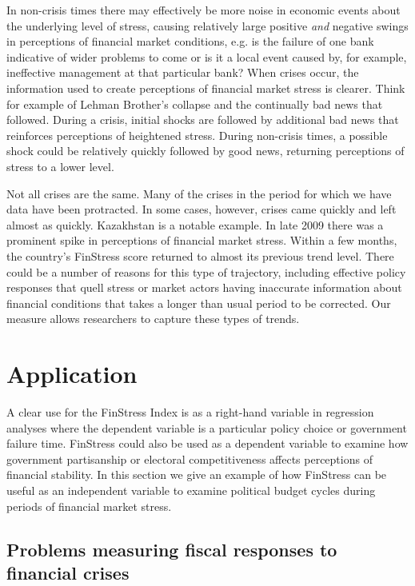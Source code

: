 \documentclass[]{article}
\begin{document}
In non-crisis times there may effectively be more noise in economic events about the underlying level of stress, causing relatively large positive \emph{and} negative swings in perceptions of financial market conditions, e.g. is the failure of one bank indicative of wider problems to come or is it a local event caused by, for example, ineffective management at that particular bank? When crises occur, the information used to create perceptions of financial market stress is clearer. Think for example of Lehman Brother's collapse and the continually bad news that followed. During a crisis, initial shocks are followed by additional bad news that reinforces perceptions of heightened stress. During non-crisis times, a possible shock could be relatively quickly followed by good news, returning perceptions of stress to a lower level.

Not all crises are the same. Many of the crises in the period for which we have data have been protracted. In some cases, however, crises came quickly and left almost as quickly. Kazakhstan is a notable example. In late 2009 there was a prominent spike in perceptions of financial market stress. Within a few months, the country's FinStress score returned to almost its previous trend level. There could be a number of reasons for this type of trajectory, including effective policy responses that quell stress or market actors having inaccurate information about financial conditions that takes a longer than usual period to be corrected. Our measure allows researchers to capture these types of trends.

\section{Application}\label{application}

A clear use for the FinStress Index is as a right-hand variable in regression analyses where the dependent variable is a particular policy choice or government failure time. FinStress could also be used as a dependent variable to examine how government partisanship or electoral competitiveness affects perceptions of financial stability. In this section we give an example of how FinStress can be useful as an independent variable to examine political budget cycles during periods of financial market stress.

\subsection{Problems measuring fiscal responses to financial crises}
\end{document}
